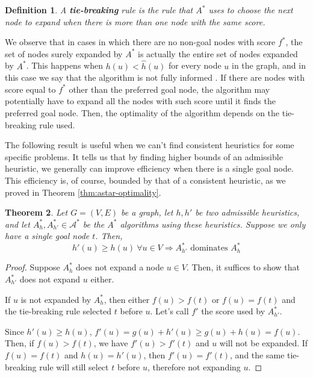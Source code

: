 \documentclass[a4paper,10pt]{report}
\newtheorem{theorem}{Theorem}[chapter]
\newtheorem{definition}[theorem]{Definition}
\begin{document}
\begin{definition}
A \textbf{tie-breaking} rule is the rule that $A^*$ uses to choose the next node to expand when there is more than one node with the same score.
\end{definition}

We observe that in cases in which there are no non-goal nodes with score $f^*$, the set of nodes surely expanded by $A^*$ is actually the entire set of nodes expanded by $A^*$. This happens when $h(u) < \hat{h}(u)$ for every node $u$ in the graph, and in this case we say that the algorithm is not fully informed \cite{optimality}. If there are nodes with score equal to $f^*$ other than the preferred goal node, the algorithm may potentially have to expand all the nodes with such score until it finds the preferred goal node. Then, the optimality of the algorithm depends on the tie-breaking rule used.

The following result is useful when we can't find consistent heuristics for some specific problems. It tells us that by finding higher bounds of an admissible heuristic, we generally can improve efficiency when there is a single goal node. This efficiency is, of course, bounded by that of a consistent heuristic, as we proved in Theorem \ref{thm:astar-optimality}.


\begin{theorem}
\label{thm:dominating-heuristic}
Let $G = (V, E)$ be a graph, let $h, h'$ be two admissible heuristics, and let $A^*_h, A^*_{h'} \in \mathcal{A^*}$ be the $A^*$ algorithms using these heuristics. Suppose we only have a single goal node $t$. Then,
\[ h'(u) \geq h(u) \  \forall u \in V \Rightarrow A^*_{h'} \text{ dominates } A^*_h \]
\end{theorem}
\begin{proof}
Suppose $A^*_h$ does not expand a node $u \in V$. Then, it suffices to show that $A^*_{h'}$ does not expand $u$ either.

If $u$ is not expanded by $A^*_h$, then either $f(u) > f(t)$ or $f(u) = f(t)$ and the tie-breaking rule selected $t$ before $u$. Let's call $f'$ the score used by $A^*_{h'}$.

Since $h'(u) \geq h(u)$, $f'(u) = g(u) + h'(u) \geq g(u) + h(u) = f(u)$. Then, if $f(u) > f(t)$, we have $f'(u) > f'(t)$ and $u$ will not be expanded. If $f(u) = f(t)$ and $h(u) = h'(u)$, then $f'(u) = f'(t)$, and the same tie-breaking rule will still select $t$ before $u$, therefore not expanding $u$.
\end{proof}
\end{document}
